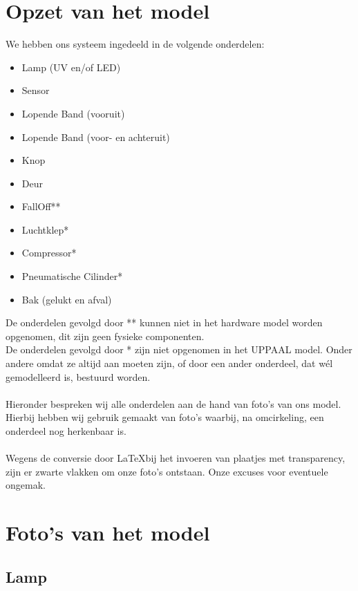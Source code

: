 \section{Opzet van het model}
We hebben ons systeem ingedeeld in de volgende onderdelen:
\begin{itemize}
    \item Lamp (UV en/of LED)
    \item Sensor 
    \item Lopende Band (vooruit)
    \item Lopende Band (voor- en achteruit)
    \item Knop
    \item Deur
    \item FallOff**
    \item Luchtklep*
    \item Compressor*
    \item Pneumatische Cilinder*
    \item Bak (gelukt en afval)

\end{itemize}

De onderdelen gevolgd door ** kunnen niet in het hardware model worden opgenomen, dit zijn geen fysieke componenten. \\
De onderdelen gevolgd door * zijn niet opgenomen in het UPPAAL model. Onder andere omdat ze altijd aan moeten zijn, of door een ander onderdeel, dat w\'el gemodelleerd is, bestuurd worden. \\ \\

Hieronder bespreken wij alle onderdelen aan de hand van foto's van ons model. Hierbij hebben wij gebruik gemaakt van foto's waarbij, na omcirkeling, een onderdeel nog herkenbaar is. \\ \\

Wegens de conversie door \LaTeX bij het invoeren van plaatjes met transparency, zijn er zwarte vlakken om onze foto's ontstaan. Onze excuses voor eventuele ongemak.


\section{Foto's van het model}\label{sec:foto_s_van_het_model} %

\subsection{Lamp}\label{sub:Lamp} %


